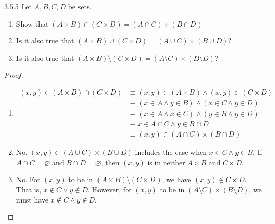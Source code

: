 \begin{exercise}{3.5.5}
	Let $A,B,C,D$ be sets.
	\begin{enumerate}
		\item Show that $(A \times B) \cap (C \times D) = (A \cap C) \times (B \cap D)$		
		\item Is it also true that $(A \times B) \cup (C \times D) = (A \cup C) \times (B \cup D)$?
		\item Is it also true that $(A \times B) \setminus (C \times D) = (A \setminus C) \times (B \setminus D)$?
	\end{enumerate}
\end{exercise}
\begin{proof}\leavevmode
	\begin{enumerate}
		\item 
		\begin{align*}
			(x,y) \in (A \times B) \cap (C \times D) 
			&\equiv (x,y) \in (A \times B) \wedge (x,y) \in (C \times D) \\
			&\equiv (x \in A \wedge y \in B) \wedge (x \in C \wedge y \in D) \\
			&\equiv (x \in A \wedge x \in C) \wedge (y \in B \wedge y \in D) \\
			&\equiv x \in A \cap C \wedge y \in B \cap D \\
			&\equiv (x,y) \in (A \cap C) \times (B \cap D)
		\end{align*}
	
		\item No. $(x,y) \in (A \cup C) \times (B \cup D)$ includes the case when $x \in C \wedge y \in B$. If $A \cap C = \varnothing$ and $B \cap D = \varnothing$, then $(x,y)$ is in neither $A \times B$ and $C \times D$.
		
		\item No. For $(x,y)$ to be in $(A \times B) \setminus (C \times D)$, we have $(x,y) \notin C \times D$. That is, $x \notin C \vee y \notin D$. However, for $(x,y)$ to be in $(A \setminus C) \times (B \setminus D)$, we must have $x \notin C \wedge y \notin D$.
	\end{enumerate}
\end{proof}

